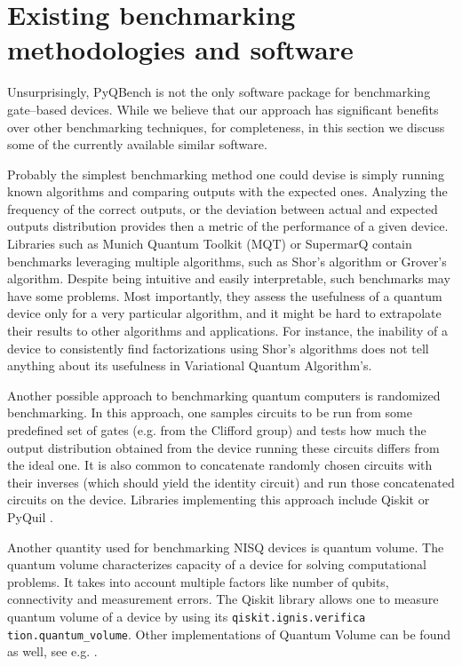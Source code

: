 \documentclass[preprint,12pt, a4paper, dvipsnames]{elsarticle}
\newcommand{\1}{{\rm 1\hspace{-0.9mm}l}}
\theoremstyle{definition}
\begin{document}
\section{Existing benchmarking methodologies and software}
Unsurprisingly, PyQBench is not the only software package for benchmarking gate--based devices.
While we believe that our approach has significant benefits over other benchmarking techniques, for
completeness, in this section we discuss some of the currently available similar software.

Probably the simplest benchmarking method one could devise is simply running known algorithms and
comparing outputs with the expected ones. Analyzing the frequency of the correct outputs, or the
deviation between actual and expected outputs distribution provides then a metric of the performance
of a given device.
 Libraries such as Munich Quantum Toolkit (MQT) \cite{mqt2022, mqt-bench}
or
 SupermarQ \cite{supermarq, supermarkq-github}
  contain
benchmarks leveraging multiple algorithms, such as Shor's algorithm or Grover's algorithm.
Despite being intuitive and easily interpretable, such benchmarks may have some problems. Most
importantly, they assess the usefulness of a quantum device only for a very particular algorithm,
and it might be hard to extrapolate their results to other algorithms and applications. For
instance, the inability of a device to consistently find factorizations using Shor's algorithms
does not tell anything about its usefulness in Variational Quantum Algorithm's.



Another possible approach to benchmarking quantum computers is randomized benchmarking. In this approach, one samples circuits to be run from some predefined set
of gates (e.g. from the Clifford group) and tests how much the output distribution obtained from the
device running these circuits differs from the ideal one. It is also common to concatenate randomly
chosen circuits with their inverses (which should yield the identity circuit) and run those
concatenated circuits on the device. Libraries implementing this approach include Qiskit \cite{qiskit-randomized} or PyQuil \cite{forest-benchmarking}.



Another quantity used for benchmarking NISQ devices is quantum volume. The quantum volume
characterizes capacity of a device for solving computational problems. It takes into account
multiple factors like number of qubits, connectivity and measurement errors. The Qiskit library allows one to
measure quantum volume of a device by using its \texttt{qiskit.ignis.verifica \\ tion.quantum\_volume}.
Other implementations of Quantum Volume can be found as well, see e.g. \cite{volume-in-practice}.
\end{document}
